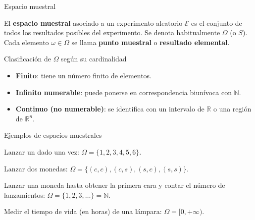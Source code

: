 \documentclass[aspectratio=169,11pt]{beamer}
\begin{document}
\begin{frame}{Espacio muestral}
\begin{definition}
El \textbf{espacio muestral} asociado a un experimento aleatorio $\mathcal{E}$ es el conjunto de todos los resultados posibles del experimento.
Se denota habitualmente $\Omega$ (o $S$). Cada elemento $\omega \in \Omega$ se llama \textbf{punto muestral} o \textbf{resultado elemental}.
\end{definition}

\begin{block}{Clasificación de $\Omega$ según su cardinalidad}
\begin{itemize}
\item \textbf{Finito}: tiene un número finito de elementos.
\item \textbf{Infinito numerable}: puede ponerse en correspondencia biunívoca con $\mathbb{N}$.
\item \textbf{Continuo (no numerable)}: se identifica con un intervalo de $\mathbb{R}$ o una región de $\mathbb{R}^n$.
\end{itemize}
\end{block}
\end{frame}

\begin{frame}{Ejemplos de espacios muestrales}
\begin{example}
Lanzar un dado una vez: $\Omega = \{1,2,3,4,5,6\}$.
\end{example}

\begin{example}
Lanzar dos monedas: $\Omega = \{(c,c),(c,s),(s,c),(s,s)\}$.
\end{example}

\begin{example}
Lanzar una moneda hasta obtener la primera cara y contar el número de lanzamientos: $\Omega = \{1,2,3,\dots\} = \mathbb{N}$.
\end{example}

\begin{example}
Medir el tiempo de vida (en horas) de una lámpara: $\Omega = [0,+\infty)$.
\end{example}
\end{frame}
\end{document}
